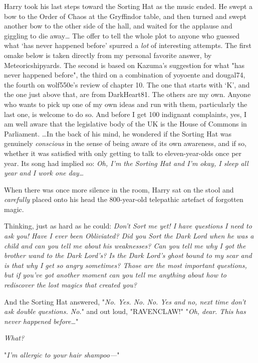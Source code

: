 Harry took his last steps toward the Sorting Hat as the music ended. He swept a 
bow to the Order of Chaos at the Gryffindor table, and then turned and swept 
another bow to the other side of the hall, and waited for the applause and 
giggling to die away{\ldots}
\sbreak
The offer to tell the whole plot to anyone who guessed what `has never happened 
before' spurred a \emph{lot} of interesting attempts. The first omake below is 
taken directly from my personal favorite answer, by Meteoricshipyards. The 
second is based on Kazuma's suggestion for what "has never happened before", 
the third on a combination of yoyoente and dougal74, the fourth on wolf550e's 
review of chapter 10. The one that starts with `K', and the one just above 
that, are from DarkHeart81. The others are my own. Anyone who wants to pick up 
one of my own ideas and run with them, particularly the last one, is welcome to 
do so. And before I get 100 indignant complaints, yes, I am well aware that the 
legislative body of the UK is the House of Commons in Parliament.
\sbreak
{\ldots}In the back of his mind, he wondered if the Sorting Hat was genuinely 
\emph{conscious} in the sense of being aware of its own awareness, and if so, 
whether it was satisfied with only getting to talk to eleven-year-olds once per 
year. Its song had implied so: \emph{Oh, I'm the Sorting Hat and I'm okay, I 
sleep all year and I work one day{\ldots}}

When there was once more silence in the room, Harry sat on the stool and 
\emph{carefully} placed onto his head the 800-year-old telepathic artefact of 
forgotten magic.

Thinking, just as hard as he could: \emph{Don't Sort me yet! I have questions I 
need to ask you! Have I ever been Obliviated? Did you Sort the Dark Lord when 
he was a child and can you tell me about his weaknesses? Can you tell me why I 
got the brother wand to the Dark Lord's? Is the Dark Lord's ghost bound to my 
scar and is that why I get so angry sometimes? Those are the most important 
questions, but if you've got another moment can you tell me anything about how 
to rediscover the lost magics that created you?}

And the Sorting Hat answered, "\emph{No. Yes. No. No. Yes and no, next time 
don't ask double questions. No.}" and out loud, "RAVENCLAW!"
\sbreak
"\emph{Oh, dear. This has never happened before{\ldots}}"

\emph{What?}

"\emph{I'm allergic to your hair shampoo---}"

